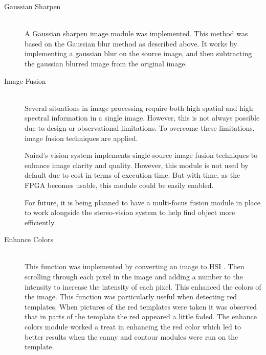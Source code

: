 \begin{description}
\item[Gaussian Sharpen]\hfill \\
A Gaussian sharpen image module was implemented. This method was based on the Gaussian blur method as described above. It works by implementing a gaussian blur on the source image, and then subtracting the gaussian blurred image from the original image. 

\item[Image Fusion]\hfill \\
Several situations in image processing require both high spatial and high spectral information in a single image. However, this is not always possible due to design or observational limitations.
To overcome these limitations, image fusion techniques are applied.

Naiad's vision system implements single-source image fusion techniques to enhance image clarity and quality. However, this module is not used by default due to cost in terms of execution time. But with time, as the FPGA becomes usable, this module could be easily enabled.

For future, it is being planned to have a multi-focus fusion module in place to work alongside the stereo-vision system to help find object more efficiently. 
\cite{article:Zheng2010} \cite{article:Zhang2010} \cite{article:Shutao}

\item[Enhance Colors]\hfill \\
This function was implemented by converting an image to HSI . Then scrolling through each pixel in the image and adding a number to the intensity to increase the intensity of each pixel. This enhanced the colors of the image. This function was particularly useful when detecting red templates. When pictures of the red templates were taken it was observed that in parts of the template the red appeared a little faded. The enhance colors module worked a treat in enhancing the red color which led to better results when the canny and contour modules were run on the template. 
\end{description}

